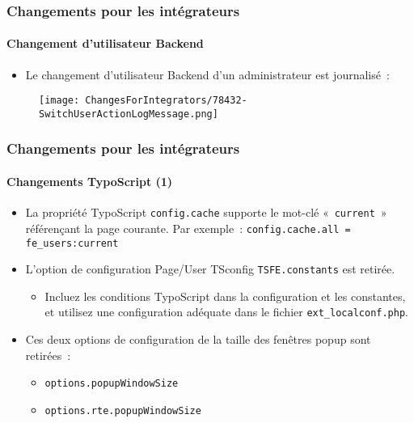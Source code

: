 
\begin{frame}[fragile]
	\frametitle{Changements pour les intégrateurs}
	\framesubtitle{Changement d'utilisateur Backend}

	\begin{itemize}
		\item Le changement d'utilisateur Backend d'un administrateur est journalisé~:
	\end{itemize}

	\begin{figure}
		\texttt{[image: ChangesForIntegrators/78432-SwitchUserActionLogMessage.png]}
	\end{figure}

\end{frame}


\begin{frame}[fragile]
	\frametitle{Changements pour les intégrateurs}
	\framesubtitle{Changements TypoScript (1)}

	\begin{itemize}
		\item La propriété TypoScript \texttt{config.cache} supporte le mot-clé
			«~\texttt{current}~» référençant la page courante. Par exemple~: \newline
			\smaller\texttt{config.cache.all = fe\_users:current}\normalsize

		\item L'option de configuration Page/User TSconfig \texttt{TSFE.constants} est retirée.

			\begin{itemize}\smaller
				\item[\ding{228}] Incluez les conditions TypoScript dans la configuration et les constantes,
				et utilisez une configuration adéquate dans le fichier \texttt{ext\_localconf.php}.
			\end{itemize}

		\item Ces deux options de configuration de la taille des fenêtres popup sont retirées~:

			\begin{itemize}
				\item \texttt{options.popupWindowSize}
				\item \texttt{options.rte.popupWindowSize}
			\end{itemize}

	\end{itemize}

\end{frame}

